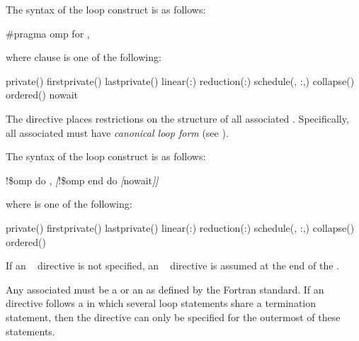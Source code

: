 \syntax
\ccppspecificstart
The syntax of the loop construct is as follows:

\begin{boxedcode}
\#pragma omp for \plc{[clause[ [},\plc{] clause] ... ] new-line} 
\end{boxedcode}

where clause is one of the following: 

\begin{indentedcodelist}
private()
firstprivate()
lastprivate()
linear(\plc{list[ }:\plc{ linear-step]})
reduction(:)
schedule(\plc{[modifier [}, \plc{modifier]}:\plc{]kind[},\plc{ chunk\_size]})
collapse()
ordered\plc{[}()\plc{]}
nowait
\end{indentedcodelist}

The  directive places restrictions on the structure of all associated . 
Specifically, all associated  must have \emph{canonical loop form} (see 
).
\ccppspecificend

\fortranspecificstart
The syntax of the loop construct is as follows:

\begin{boxedcode}
!\$omp do \plc{[clause[ [},\plc{] clause] ... ]}
\textsl{[}!\$omp end do \textsl{[}nowait\textsl{]]}
\end{boxedcode}

where  is one of the following:

\begin{indentedcodelist}
private()
firstprivate()
lastprivate()
linear(\plc{list[ }:\plc{ linear-step]})
reduction(:)
schedule(\plc{[modifier [}, \plc{modifier]}:\plc{]kind[},\plc{ chunk\_size]})
collapse()
ordered\plc{[}()\plc{]}
\end{indentedcodelist}

If an ~ directive is not specified, an ~ directive is assumed at the end of the 
.

Any associated  must be a  or an
 as defined by the Fortran standard. If
an ~ directive follows a  in
which several loop statements share a  termination statement,
then the directive can only be specified for the outermost of these
 statements.

